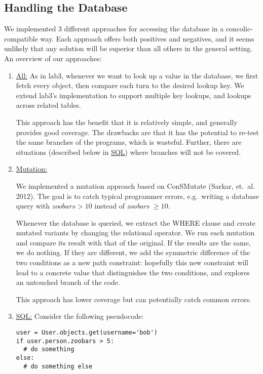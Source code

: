 \documentclass{scrartcl}
\begin{document}
\subsection{Handling the Database}

We implemented 3 different approaches for accessing the database in a
concolic-compatible way. Each approach offers both positives and negatives, and it
seems unlikely that any solution will be superior than all others in the general
setting. An overview of our approaches:

\begin{enumerate}
\item \underline{All:} As in lab3, whenever we want to look up a value
  in the database, we first fetch every object, then compare each turn to the
  desired lookup key. We extend lab3's implementation to support multiple key
  lookups, and lookups across related tables. 

  This approach has the benefit that it is relatively simple, and generally
  provides good coverage. The drawbacks are that it has the potential to re-test
  the same branches of the programs, which is wasteful. Further, there are
  situations (described below in \underline{SQL}) where branches will not be
  covered.

\item \underline{Mutation:}

We implemented a mutation approach based on ConSMutate (Sarkar, et.\ al. 2012).
The goal is to catch typical programmer errors, e.g.\ writing a database
query with $\textit{zoobars} > 10$ instead of \textit{zoobars }$ \geq 10$.

Whenever the database is queried, we extract the WHERE clause and create mutated
variants by changing the relational operator. We run each mutation and compare
its result with that of the original. If the results are the same, we do
nothing. If they are different, we add the symmetric difference of the two
conditions as a new path constraint: hopefully this new constraint will
lead to a concrete value that distinguishes the two conditions, and explores an
untouched branch of the code.

This approach has lower coverage but can potentially catch common errors.

\item \underline{SQL:} Consider the following pseudocode:

\begin{verbatim}
user = User.objects.get(username='bob')
if user.person.zoobars > 5:
  # do something
else:
  # do something else
\end{verbatim}


\end{enumerate}
\end{document}
